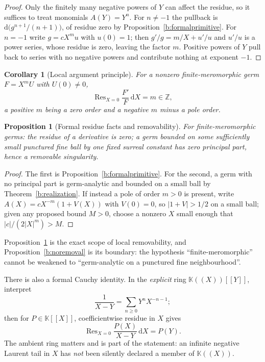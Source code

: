 \documentclass[11pt,a4paper]{article}
\numberwithin{equation}{section}
\newtheorem{proposition}[theorem]{Proposition}
\newtheorem{corollary}[theorem]{Corollary}
\theoremstyle{definition}
\theoremstyle{remark}
\theoremstyle{plain}
\newcommand{\K}{\mathbb K}
\newcommand{\ZZ}{\mathbb Z}
\DeclareMathOperator{\Res}{Res}                 %
\newcommand{\abs}[1]{\lvert #1\rvert}
\newcommand{\dd}{\mathrm d}
\begin{document}
\begin{proof}
Only the finitely many negative powers of $Y$ can affect the residue, so
it suffices to treat monomials $A(Y)=Y^{n}$. For $n\ne-1$ the pullback is
$\dd\bigl(g^{n+1}/(n+1)\bigr)$, of residue zero by
Proposition~\ref{b:formalprimitive}. For $n=-1$ write $g=cX^{m}u$ with
$u(0)=1$; then $g'/g=m/X+u'/u$ and $u'/u$ is a power series, whose residue
is zero, leaving the factor $m$. Positive powers of $Y$ pull back to
series with no negative powers and contribute nothing at exponent $-1$.
\end{proof}

\begin{corollary}[Local argument principle]
\label{b:localargument}
For a nonzero finite-meromorphic germ $F=X^{m}U$ with $U(0)\ne0$,
\[
 \Res_{X=0}\frac{F'}{F}\,\dd X=m\in\ZZ ,
\]
a positive $m$ being a zero order and a negative $m$ minus a pole order.
\end{corollary}

\begin{proposition}[Formal residue facts and removability]
\label{b:formalres}
For finite-meromorphic germs: the residue of a derivative is zero; a germ
bounded on some sufficiently small punctured fine ball by one fixed surreal
constant has zero principal part, hence a removable singularity.
\end{proposition}

\begin{proof}
The first is Proposition~\ref{b:formalprimitive}. For the second, a germ
with no principal part is germ-analytic and bounded on a small ball by
Theorem~\ref{b:realization}. If instead a pole of order $m>0$ is present,
write $A(X)=cX^{-m}(1+V(X))$ with $V(0)=0$, so $\abs{1+V}>1/2$ on a small
ball; given any proposed bound $M>0$, choose a nonzero $X$ small enough
that $\abs c/(2\abs X^{m})>M$.
\end{proof}

Proposition~\ref{b:formalres} is the exact scope of local removability,
and Proposition~\ref{b:noremoval} is its boundary: the hypothesis
``finite-meromorphic'' cannot be weakened to ``germ-analytic on a punctured
fine neighbourhood''.

There is also a formal Cauchy identity. In the \emph{explicit} ring
$\K((X))[[Y]]$, interpret
\[
 \frac1{X-Y}=\sum_{n\ge0}Y^{n}X^{-n-1};
\]
then for $P\in\K[[X]]$, coefficientwise residue in $X$ gives
\begin{equation}
\label{b:eq-formalCauchy}
 \Res_{X=0}\frac{P(X)}{X-Y}\,\dd X=P(Y).
\end{equation}
The ambient ring matters and is part of the statement: an infinite
negative Laurent tail in $X$ has \emph{not} been silently declared a
member of $\K((X))$.
\end{document}
